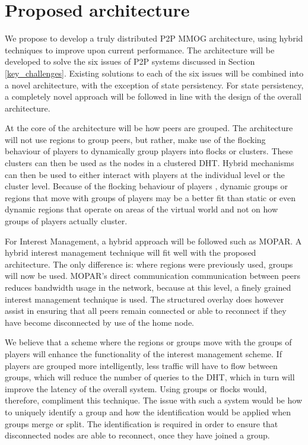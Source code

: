 \documentclass[journal,oneside,a4paper,onecolumn]{IEEEtran}
\begin{document}
\section{Proposed architecture}
\label{proposed_architecture}

We propose to develop a truly distributed P2P MMOG architecture, using hybrid techniques to improve upon current performance. The architecture will be developed to solve the six issues of P2P systems discussed in Section \ref{key_challenges}. Existing solutions to each of the six issues will be combined into a novel architecture, with the exception of state persistency. For state persistency, a completely novel approach will be followed in line with the design of the overall architecture.

At the core of the architecture will be how peers are grouped. The architecture will not use regions to group peers, but rather, make use of the flocking behaviour of players to dynamically group players into flocks or clusters. These clusters can then be used as the nodes in a clustered \ac{DHT}. Hybrid mechanisms can then be used to either interact with players at the individual level or the cluster level. Because of the flocking behaviour of players \cite{flocking}, dynamic groups or regions that move with groups of players may be a better fit than static or even dynamic regions that operate on areas of the virtual world and not on how groups of players actually cluster.

For Interest Management, a hybrid approach will be followed such as MOPAR. A hybrid interest management technique will fit well with the proposed architecture. The only difference is: where regions were previously used, groups will now be used. MOPAR's direct communication communication between peers reduces bandwidth usage in the network, because at this level, a finely grained interest management technique is used. The structured overlay does however assist in ensuring that all peers remain connected or able to reconnect if they have become disconnected by use of the home node.

We believe that a scheme where the regions or groups move with the groups of players will enhance the functionality of the interest management scheme. If players are grouped more intelligently, less traffic will have to flow between groups, which will reduce the number of queries to the DHT, which in turn will improve the latency of the overall system. Using groups or flocks would, therefore, compliment this technique. The issue with such a system would be how to uniquely identify a group and how the identification would be applied when groups merge or split. The identification is required in order to ensure that disconnected nodes are able to reconnect, once they have joined a group.
\end{document}
